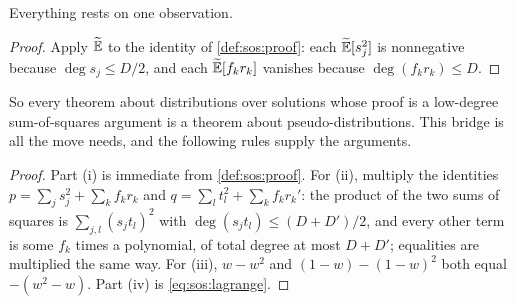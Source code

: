 \begin{refsection}
Everything rests on one observation.


\begin{proof}
Apply $\widetilde{\mathbb{E}}$ to the identity of \cref{def:sos:proof}: each $\widetilde{\mathbb{E}}[s_j^2]$ is nonnegative because $\deg s_j\le D/2$, and each $\widetilde{\mathbb{E}}[f_kr_k]$ vanishes because $\deg(f_kr_k)\le D$.
\end{proof}

So every theorem about distributions over solutions whose proof is a low-degree sum-of-squares argument is a theorem about pseudo-distributions. This bridge is all the move needs, and the following rules supply the arguments.


\begin{proof}
Part (i) is immediate from \cref{def:sos:proof}. For (ii), multiply the identities $p=\sum_js_j^2+\sum_kf_kr_k$ and $q=\sum_lt_l^2+\sum_kf_kr_k'$: the product of the two sums of squares is $\sum_{j,l}(s_jt_l)^2$ with $\deg(s_jt_l)\le(D+D')/2$, and every other term is some $f_k$ times a polynomial, of total degree at most $D+D'$; equalities are multiplied the same way. For (iii), $w-w^2$ and $(1-w)-(1-w)^2$ both equal $-(w^2-w)$. Part (iv) is \eqref{eq:sos:lagrange}.
\end{proof}


\end{refsection}
